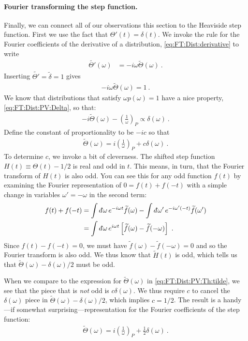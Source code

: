 \paragraph{Fourier transforming the step function.}
Finally, we can connect all of our observations this section to the Heaviside step function. First we use the fact that $\Theta'(t) = \delta(t)$. We invoke the rule for the Fourier coefficients of the derivative of a distribution, \eqref{eq:FT:Dist:derivative} to write
\begin{align}
	\tilde{\Theta'}(\omega) &= -i\omega \tilde \Theta(\omega) \ .
\end{align}
Inserting $\tilde{\Theta'}=\tilde\delta = 1$ gives
\begin{align}
	-i\omega\tilde \Theta(\omega) = 1 \ .
\end{align}
We know that distributions that satisfy $\omega p(\omega) =1$ have a nice property, \eqref{eq:FT:Dist:PV:Delta}, so that:
\begin{align}
	-i\tilde \Theta(\omega) - \left(\frac{1}{\omega}\right)_P \propto \delta(\omega) \ .
\end{align}
Define the constant of proportionality to be $-ic$ so that
\begin{align}
	\tilde \Theta(\omega) = 
	i\left(\frac{1}{\omega}\right)_P + c \delta(\omega) \ .
	\label{eq:FT:Dist:PV:Th:tilde}
\end{align}
To determine $c$, we invoke a bit of cleverness. The shifted step function $H(t)\equiv\Theta(t) - 1/2$ is real and odd in $t$. This means, in turn, that the Fourier transform of $H(t)$ is also odd. You can see this for any odd function $f(t)$ by examining the Fourier representation of $0=f(t)+f(-t)$ with a simple change in variables $\omega' = -\omega$ in the second term:
\begin{align}
	f(t)+f(-t) &= 
	\int \dbar \omega \,
 	e^{-i\omega t} \tilde f(\omega) 
	-
	\int \dbar \omega' \, e^{-i\omega'(-t)}  \tilde f(\omega') 
	\\&=
	\int \dbar\omega\, e^{i \omega t} 
	\left[\tilde f(\omega) - \tilde f(-\omega) \right] \ .
\end{align}
Since $f(t)-f(-t)=0$, we must have $\tilde f(\omega)- \tilde f(-\omega) =0$ and so the Fourier transform is also odd. We thus know that $\tilde H(t)$ is odd, which tells us that $\tilde\Theta(\omega) - \delta(\omega)/2$ must be odd. 

When we compare to the expression for $\tilde\Theta(\omega)$ in \eqref{eq:FT:Dist:PV:Th:tilde}, we see that the piece that is \emph{not} odd is $c\delta(\omega)$. We thus require $c$ to cancel the $\delta(\omega)$ piece in $\tilde\Theta(\omega) - \delta(\omega)/2$, which implies $c=1/2$. The result is a handy---if somewhat surprising---representation for the Fourier coefficients of the step function:
\begin{align}
	\tilde \Theta(\omega) = i\left(\frac{1}{\omega}\right)_P + \frac{1}{2}\delta(\omega) \ .
\end{align}



